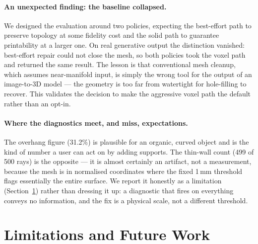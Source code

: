 \documentclass[11pt,a4paper]{article}
\begin{document}
\paragraph{An unexpected finding: the baseline collapsed.}
We designed the evaluation around two policies, expecting the best-effort path
to preserve topology at some fidelity cost and the solid path to guarantee
printability at a larger one. On real generative output the distinction
vanished: best-effort repair could not close the mesh, so both policies took the
voxel path and returned the same result. The lesson is that conventional mesh
cleanup, which assumes near-manifold input, is simply the wrong tool for the
output of an image-to-3D model --- the geometry is too far from watertight for
hole-filling to recover. This validates the decision to make the aggressive
voxel path the default rather than an opt-in.

\paragraph{Where the diagnostics meet, and miss, expectations.}
The overhang figure (31.2\%) is plausible for an organic, curved object and is
the kind of number a user can act on by adding supports. The thin-wall count
(499 of 500 rays) is the opposite --- it is almost certainly an artifact, not a
measurement, because the mesh is in normalised coordinates where the fixed
1\,mm threshold flags essentially the entire surface. We report it honestly as a
limitation (Section~\ref{sec:limitations}) rather than dressing it up: a
diagnostic that fires on everything conveys no information, and the fix is a
physical scale, not a different threshold.

\section{Limitations and Future Work}
\label{sec:limitations}
\end{document}
